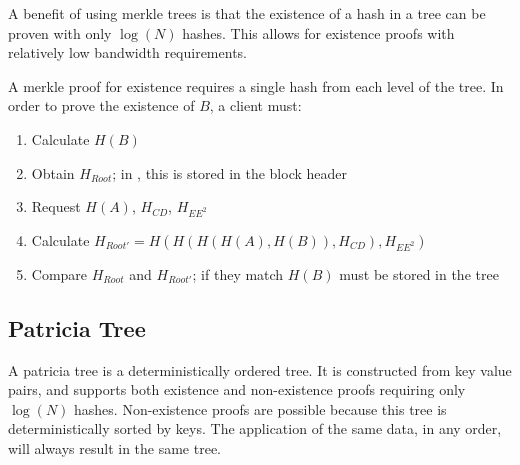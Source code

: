 \begin{figure}
\end{figure}

A benefit of using merkle trees is that the existence of a hash in a tree can be proven with only $\log(N)$ hashes.
This allows for existence proofs with relatively low bandwidth requirements.

A merkle proof for existence requires a single hash from each level of the tree.
In order to prove the existence of $B$, a client must:
\begin{enumerate}
	\item{Calculate $H(B)$}
	\item{Obtain $H_{Root}$; in \codename, this is stored in the block header}
	\item{Request $H(A)$, $H_{CD}$, $H_{EE^2}$}
	\item{Calculate $H_{Root'} = H(H(H(H(A), H(B)), H_{CD}), H_{EE^2})$}
	\item{Compare $H_{Root}$ and $H_{Root'}$; if they match $H(B)$ must be stored in the tree}
\end{enumerate}

\subsection{Patricia Tree}

A patricia tree is a deterministically ordered tree.
It is constructed from key value pairs, and supports both existence and non-existence proofs requiring only $\log(N)$ hashes.
Non-existence proofs are possible because this tree is deterministically sorted by keys.
The application of the same data, in any order, will always result in the same tree.

